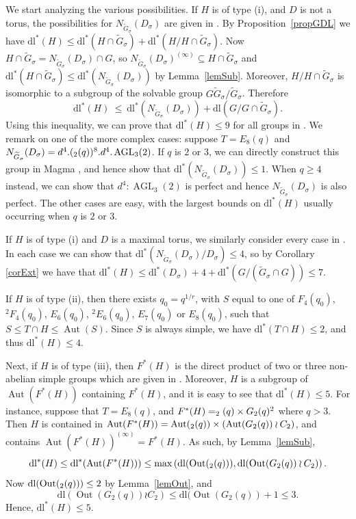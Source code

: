 \documentclass[11pt]{amsart}
\numberwithin{equation}{section}
\theoremstyle{definition}
\theoremstyle{remark}
\newcommand{\Aut}{\mathop{\mathrm{Aut}}}
\newcommand{\AGL}{\mathop{\mathrm{AGL}}}
\newcommand{\Out}{\mathop{\mathrm{Out}}}
\newcommand{\dll}{\mathrm{dl^*}}
\newcommand{\dl}{\mathrm{dl}}
\let\L\relax
\DeclareMathOperator{\L}{L}
\begin{document}
We start analyzing the various possibilities.
If $H$ is of type (i), and $D$ is not a torus, the possibilities for $N_{\widetilde G_\sigma}(D_\sigma)$ are given in \cite[Tab.~5.1]{LSS90}. By Proposition~\ref{propGDL} we have $\dll(H) \leq \dll(H \cap \widetilde G _\sigma) + \dll(H/ H \cap \widetilde G_\sigma)$.
Now $H \cap \widetilde G _\sigma = N_{\widetilde G_\sigma}(D_\sigma) \cap G$, so $N_{\widetilde G_\sigma}(D_\sigma)^{(\infty)} \subseteq H \cap \widetilde G_\sigma$ and $\dll(H \cap \widetilde G_\sigma) \leq \dll(N_{\widetilde G_\sigma}(D_\sigma))$ by Lemma~\ref{lemSub}.
Moreover, $H/ H \cap \widetilde G_\sigma$ is isomorphic to a subgroup of the solvable group $G \widetilde G_\sigma/ \widetilde G_\sigma$.
Therefore
\[
    \dll(H) \> \leq \>
    \dll(N_{\widetilde G_\sigma}(D_\sigma)) + \dl(G/ G \cap \widetilde G_\sigma).
\]
Using this inequality, we can prove that $\dll(H) \leq 9$ for all groups in \cite[Tab.~5.1]{LSS90}.
We remark on one of the more complex cases: suppose $T=E_8(q)$ and $N_{\widetilde G_\sigma}(D_\sigma)= d^4.(\L_2(q))^8.d^4.\AGL_3(2)$. If $q$ is $2$ or $3$, we can directly construct this group in Magma \cite{magma}, and hence show that $\dll(N_{\widetilde G_\sigma}(D_\sigma)) \leq 1$. When $q \geq 4$ instead, we can show that $d^4:\AGL_3(2)$ is perfect and hence $N_{\widetilde G_\sigma}(D_\sigma)$ is also perfect. The other cases are easy, with the largest bounds on $\dll(H)$ usually occurring when $q$ is $2$ or $3$.

If $H$ is of type (i) and $D$ is a maximal torus, we similarly consider every case in \cite[Tab.~5.2]{LSS90}. In each case we can show that $\dll(N_{\widetilde G_\sigma}(D_\sigma)/D_\sigma) \leq 4$, so by Corollary \ref{corExt} we have that $\dll(H) \leq \dll(D_\sigma) + 4 + \dll(G/(\widetilde G_\sigma \cap G)) \leq 7$.

If $H$ is of type (ii), then there exists $q_0 = q^{1/r}$, with $S$ equal to one of $F_4(q_0)$, ${}^2F_4(q_0)$, $E_6(q_0)$, ${}^2E_6(q_0)$, $E_7(q_0)$ or $E_8(q_0)$, such that $S \leqslant T \cap H \leqslant \Aut(S)$. Since $S$ is always simple, we have $\dll(T \cap H) \leq 2$, and thus $\dll(H) \leq 4$. 

Next, if $H$ is of type (iii), then $F^*(H)$ is the direct product of two or three non-abelian simple groups which are given in \cite[Tab.~III]{LS90}.
Moreover, $H$ is a subgroup of $\Aut(F^*(H))$ containing $F^*(H)$,
and it is easy to see that $\dll(H) \leq 5$.
For instance, suppose that $T = E_8(q)$, and $F^*(H) = \L_2(q) \times G_2(q)^2$ where $q > 3$. Then $H$ is contained in $\Aut(F^*(H)) = \Aut(\L_2(q)) \times (\Aut(G_2(q)) \wr C_2)$, and contains $\Aut(F^*(H))^{(\infty)} = F^*(H)$. As such, by Lemma~\ref{lemSub},
\[
    \dll(H) \leq \dll(\Aut(F^*(H))) \leq \max \left( \dl(\Out(\L_2(q))), \dl(\Out(G_2(q)) \wr C_2) \right) .
\]
Now $\dl(\Out(\L_2(q))) \leq 2$ by Lemma~\ref{lemOut}, and 
\[
    \dl(\Out(G_2(q)) \wr C_2) \leq \dl(\Out(G_2(q)) + 1 \leq 3.
\]
Hence, $\dll(H) \leq 5$.
\end{document}
